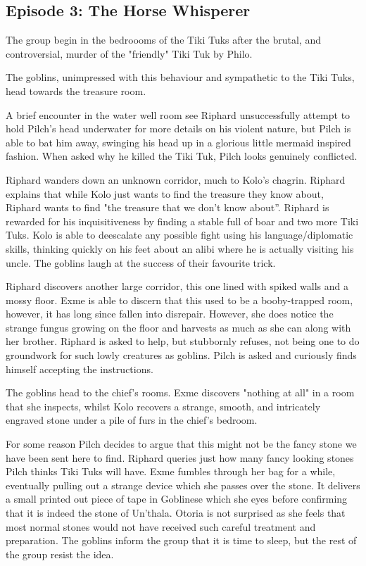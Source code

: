 \subsection{Episode 3: The Horse Whisperer}

The group begin in the bedroooms of the Tiki Tuks after the brutal, and controversial, murder of the "friendly" Tiki Tuk by Philo.\medskip

The goblins, unimpressed with this behaviour and sympathetic to the Tiki Tuks, head towards the treasure room.\medskip

A brief encounter in the water well room see Riphard unsuccessfully attempt to hold Pilch’s head underwater for more details on his violent nature, but Pilch is able to bat him away, swinging his head up in a glorious little mermaid inspired fashion. When asked why he killed the Tiki Tuk, Pilch looks genuinely conflicted.\medskip

Riphard wanders down an unknown corridor, much to Kolo's chagrin. Riphard explains that while Kolo just wants to find the treasure they know about, Riphard wants to find "the treasure that we don't know about”. Riphard is rewarded for his inquisitiveness by finding a stable full of boar and two more Tiki Tuks. Kolo is able to deescalate any possible fight using his language/diplomatic skills, thinking quickly on his feet about an alibi where he is actually visiting his uncle. The goblins laugh at the success of their favourite trick.\medskip

Riphard discovers another large corridor, this one lined with spiked walls and a mossy floor. Exme is able to discern that this used to be a booby-trapped room, however, it has long since fallen into disrepair. However, she does notice the strange fungus growing on the floor and harvests as much as she can along with her brother. Riphard is asked to help, but stubbornly refuses, not being one to do groundwork for such lowly creatures as goblins. Pilch is asked and curiously finds himself accepting the instructions.\medskip

The goblins head to the chief’s rooms. Exme discovers "nothing at all" in a room that she inspects, whilst Kolo recovers a strange, smooth, and intricately engraved stone under a pile of furs in the chief’s bedroom.\medskip

For some reason Pilch decides to argue that this might not be the fancy stone we have been sent here to find. Riphard queries just how many fancy looking stones Pilch thinks Tiki Tuks will have. Exme fumbles through her bag for a while, eventually pulling out a strange device which she passes over the stone. It delivers a small printed out piece of tape in Goblinese which she eyes before confirming that it is indeed the stone of Un’thala. Otoria is not surprised as she feels that most normal stones would not have received such careful treatment and preparation. The goblins inform the group that it is time to sleep, but the rest of the group resist the idea.\medskip

